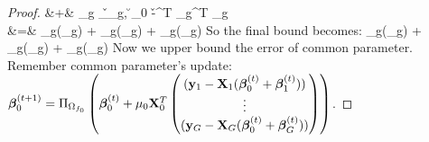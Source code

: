 \begin{proof}
	&+&  \mu_g    \sup_{\v \in \cB_g, \u \in \cB_0} -\v^T \X_g^T \X_g \u \\ \nr   
	&=&  \rho_g(\mu_g)   +   \xi_g(\mu_g)  +  \phi_g(\mu_g)  
	\ee 
	So the final bound becomes:
	\beq 
	\label{eq:optg}
	 \leq \rho_g(\mu_g)   +  \xi_g(\mu_g)  + \phi_g(\mu_g)  
	\eeq 	
	Now we upper bound the error of common parameter. Remember common parameter's update:
	$\boldsymbol{\beta} _0^{(t+1)} = \Pi_{\Omega_{f_0}} \left(\boldsymbol{\beta}_0^{(t)} + \mu_0 \mathbf{X}_0^T   
	\begin{pmatrix}
	(\mathbf{y}_1 - \mathbf{X}_1 (\boldsymbol{\beta}_0^{(t)} + \boldsymbol{\beta} _1^{(t)}))     \\
	\vdots 	 \\
	(\mathbf{y}_G - \mathbf{X}_G (\boldsymbol{\beta}_0^{(t)} + \boldsymbol{\beta} _G^{(t)})) 
	\end{pmatrix}\right)$.
	

\end{proof}
